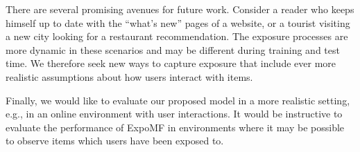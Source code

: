 There are several promising avenues for future work. 
Consider a reader who keeps himself up to date with the ``what's new'' pages 
of a website, or 
a tourist visiting a new city looking for a restaurant recommendation. 
The exposure processes are more dynamic in these scenarios 
and may be different during training and test time. 
We therefore seek new ways to capture exposure that include 
ever more realistic assumptions about how users interact with items. 

Finally, we would like to evaluate our proposed model in a more realistic
setting, e.g., in an online environment with user interactions. It
would be instructive to evaluate the performance of ExpoMF in environments
where it may be possible to observe items which users have been exposed
to.

%
%

